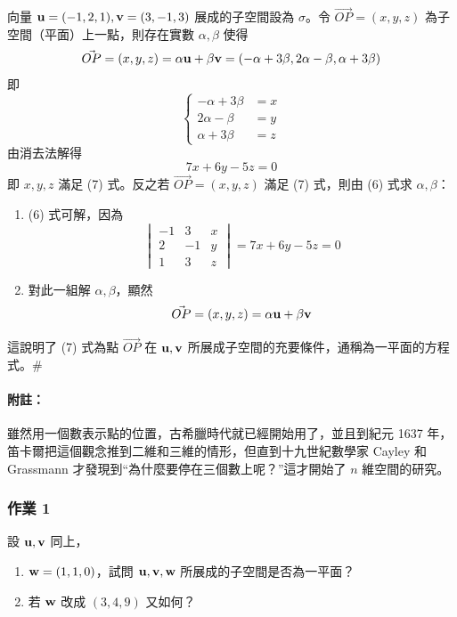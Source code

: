 \begin{discussion}\label{disc:b6-1-1}
向量 $\boldsymbol{\mathbf{u}}=(-1, 2, 1), \boldsymbol{\mathbf{v}}=(3, -1, 3)$ 展成的子空間設為 $\sigma$。令 $\vec{OP}=(x, y, z)$ 為子空間（平面）上一點，則存在實數 $\alpha, \beta$ 使得
\[ \vec{OP}=(x, y, z) = \alpha \boldsymbol{\mathbf{u}} + \beta \boldsymbol{\mathbf{v}} = (-\alpha+3\beta, 2\alpha-\beta, \alpha+3\beta) \]
即
\begin{equation}
\left\{\begin{aligned}
-\alpha + 3\beta &= x \\
2\alpha - \beta &= y \\
\alpha + 3\beta &= z
\end{aligned}\right. \label{eq:b6-1-1-6}
\end{equation}
由消去法解得
\begin{equation}
7x + 6y - 5z = 0 \label{eq:b6-1-1-7}
\end{equation}
即 $x, y, z$ 滿足 (7) 式。反之若 $\vec{OP}=(x, y, z)$ 滿足 (7) 式，則由 (6) 式求 $\alpha, \beta$：
\begin{enumerate}[label=(\roman*), leftmargin=2em]
  \item (6) 式可解，因為
  \[ \begin{vmatrix} -1 & 3 & x \\ 2 & -1 & y \\ 1 & 3 & z \end{vmatrix} = 7x + 6y - 5z = 0 \]
  \item 對此一組解 $\alpha, \beta$，顯然
  \[ \vec{OP} = (x, y, z) = \alpha\boldsymbol{\mathbf{u}} + \beta\boldsymbol{\mathbf{v}} \]
\end{enumerate}
這說明了 (7) 式為點 $\vec{OP}$ 在 $\boldsymbol{\mathbf{u}}, \boldsymbol{\mathbf{v}}$ 所展成子空間的充要條件，通稱為一平面的方程式。\hfill$\#$
\end{discussion}

\paragraph{附註：}雖然用一個數表示點的位置，古希臘時代就已經開始用了，並且到紀元 1637 年，笛卡爾把這個觀念推到二維和三維的情形，但直到十九世紀數學家 Cayley 和 Grassmann 才發現到“為什麼要停在三個數上呢？”這才開始了 $n$ 維空間的研究。

\subsubsection*{作業 1}\label{hw:b6-1-1}
設 $\boldsymbol{\mathbf{u}}, \boldsymbol{\mathbf{v}}$ 同上，
\begin{enumerate}[label=(\roman*), leftmargin=2em]
  \item $\boldsymbol{\mathbf{w}}=(1, 1, 0)$，試問 $\boldsymbol{\mathbf{u}}, \boldsymbol{\mathbf{v}}, \boldsymbol{\mathbf{w}}$ 所展成的子空間是否為一平面？
  \item 若 $\boldsymbol{\mathbf{w}}$ 改成 $(3, 4, 9)$ 又如何？
\end{enumerate}


